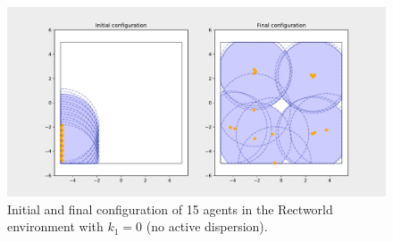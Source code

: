 \begin{figure}[H]
  \centering
  \includegraphics[width=\textwidth]{figs/bigworld_15_agnt_k_1_0_k_2_1_distr.pdf}
  \caption{Initial and final configuration of 15 agents in the Rectworld environment with $k_{1} = 0$ (no active dispersion).}
  \label{fig:15_agnt_bw_k_1_0_k_2_1_distr}
\end{figure}
